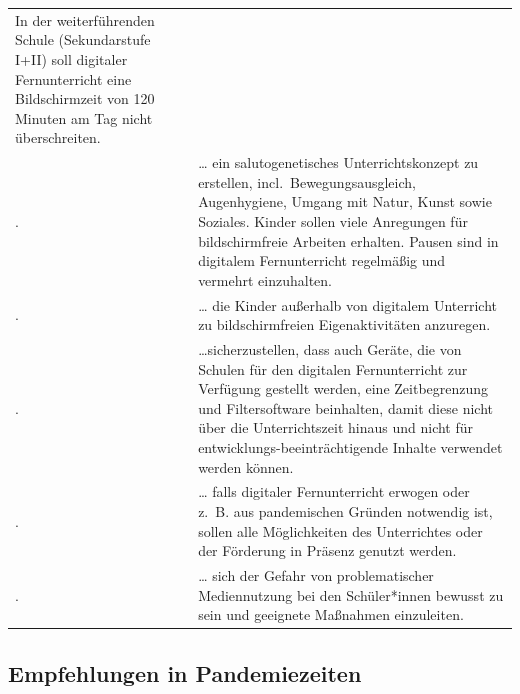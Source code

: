 \documentclass[
  letterpaper,
  DIV=11]{scrartcl}
\begin{document}
\begin{longtable}[]{@{}
  >{\raggedright\arraybackslash}p{}
  >{\raggedright\arraybackslash}p{}@{}}
In der weiterführenden Schule (Sekundarstufe I+II) soll digitaler
Fernunterricht eine Bildschirmzeit von 120 Minuten am Tag nicht
überschreiten. \\
42. & \ldots{} ein salutogenetisches Unterrichtskonzept zu erstellen,
incl.~Bewegungsausgleich, Augenhygiene, Umgang mit Natur, Kunst sowie
Soziales. Kinder sollen viele Anregungen für bildschirmfreie Arbeiten
erhalten. Pausen sind in digitalem Fernunterricht regelmäßig und
vermehrt einzuhalten. \\
43. & \ldots{} die Kinder außerhalb von digitalem Unterricht zu
bildschirmfreien Eigenaktivitäten anzuregen. \\
44. & \ldots sicherzustellen, dass auch Geräte, die von Schulen für den
digitalen Fernunterricht zur Verfügung gestellt werden, eine
Zeitbegrenzung und Filtersoftware beinhalten, damit diese nicht über die
Unterrichtszeit hinaus und nicht für entwicklungs-beeinträchtigende
Inhalte verwendet werden können. \\
45. & \ldots{} falls digitaler Fernunterricht erwogen oder z.~B. aus
pandemischen Gründen notwendig ist, sollen alle Möglichkeiten des
Unterrichtes oder der Förderung in Präsenz genutzt werden. \\
46. & \ldots{} sich der Gefahr von problematischer Mediennutzung bei den
Schüler*innen bewusst zu sein und geeignete Maßnahmen einzuleiten. \\
\end{longtable}

\hypertarget{empfehlungen-in-pandemiezeiten}{%
\subsection{Empfehlungen in
Pandemiezeiten}\label{empfehlungen-in-pandemiezeiten}}
\end{document}
